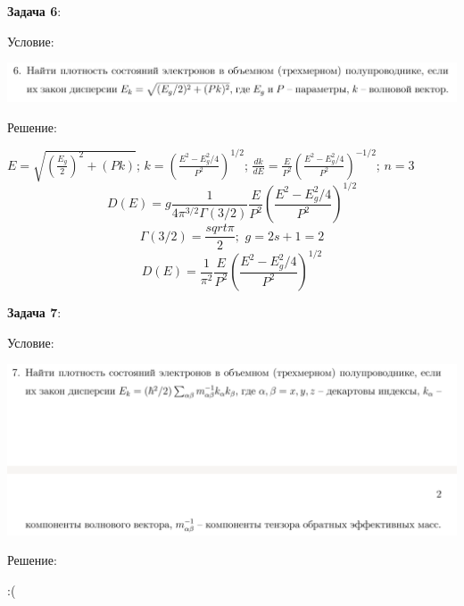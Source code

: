\documentclass[12pt]{article}
\begin{document}
\begin{large}
\par \textbf{Задача 6}:
\par Условие:
\par
\includegraphics[width=1\textwidth]{photo_6.png}
\par Решение:
\par $E = \sqrt{\left( \frac{E_g}{2} \right)^2 + \left( P k \right)}$; $k = \left( \frac{E^2 - E_g^2/4}{P^2} \right)^{1/2}$; $\frac{dk}{dE} = \frac{E}{P^2}\left( \frac{E^2 - E_g^2/4}{P^2} \right)^{-1/2}$; $n=3$
\[
    D(E) = g \frac{1}{4 \pi^{3/2} \Gamma (3/2)} \frac{E}{P^2}\left( \frac{E^2 - E_g^2/4}{P^2} \right)^{1/2}
\]
\[
    \Gamma(3/2) = \frac{sqrt{\pi}}{2} ; \,\, g = 2s+1 = 2
\]
\[
    D(E) = \frac{1}{\pi^2} \frac{E}{P^2}\left( \frac{E^2 - E_g^2/4}{P^2} \right)^{1/2}
\]
\par

\par \textbf{Задача 7}:
\par Условие:
\par
\includegraphics[width=1\textwidth]{photo_7.png}
\par Решение:
\par :(
\par


\end{large}
\end{document}
